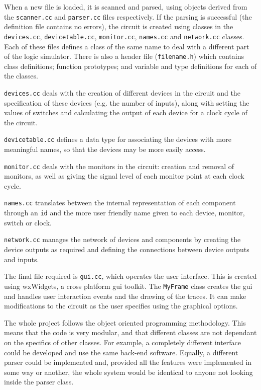 \documentclass[a4paper,10pt]{article}  %
\begin{document}
When a new file is loaded, it is scanned and parsed, using objects
derived from the \texttt{scanner.cc} and \texttt{parser.cc} files
respectively. If the parsing is successful (the definition file
contains no errors), the circuit is created using classes in the
\texttt{devices.cc}, \texttt{devicetable.cc}, \texttt{monitor.cc},
\texttt{names.cc} and \texttt{network.cc} classes. Each of these files
defines a class of the same name to deal with a different part of the logic
simulator. There is also a header file (\texttt{filename.h}) which
contains class definitions; function prototypes; and variable and type
definitions for each of the classes.

\texttt{devices.cc} deals with the creation of different
devices in the circuit and the specification of these devices
(e.g. the number of inputs), along with setting the values of switches
and calculating the output of each device for a clock cycle of the circuit.

\texttt{devicetable.cc} defines a data type for associating the
devices with more meaningful names, so that the devices may be more
easily access.

\texttt{monitor.cc} deals with the monitors in the circuit: creation
and removal of monitors, as well as giving the signal level of each
monitor point at each clock cycle.

\texttt{names.cc} translates between the internal representation of
each component through an \texttt{id} and the more user friendly name
given to each device, monitor, switch or clock.

\texttt{network.cc} manages the network of devices and components by
creating the device outputs as required and defining the connections
between device outputs and inputs.

The final file required is \texttt{gui.cc}, which operates the user
interface. This is created using wxWidgets, a cross platform gui
toolkit. The \texttt{MyFrame} class creates the gui and handles user
interaction events and the drawing of the traces. It can make
modifications to the circuit as the user specifies using the graphical
options.

The whole project follows the object oriented programming
methodology. This means that the code is very modular, and that
different classes are not dependant on the specifics of other classes. For example, a
completely different interface could be developed and use the same
back-end software. Equally, a different parser could be implemented
and, provided all the features were implemented in some way or
another, the whole system would be identical to anyone not looking
inside the parser class.
\end{document}
